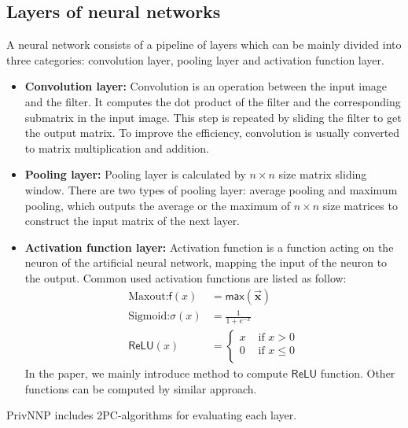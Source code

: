 \documentclass[letterpaper]{article} %
\begin{document}
    \subsection{Layers of neural networks}
    A neural network consists of a pipeline of layers which can be mainly divided into three categories:
    convolution layer, pooling layer and activation function layer.
    \begin{itemize}
        \item \textbf{Convolution layer:}
        Convolution is an operation between the input image and the filter.
        It computes the dot product of the filter and the corresponding submatrix in the input image.
        This step is repeated by sliding the filter to get the output matrix.
        To improve the efficiency, convolution is usually converted to matrix multiplication and addition.

        \item \textbf{Pooling layer:}
        Pooling layer is calculated by $n\times n$ size matrix sliding window.
        There are two types of pooling layer: average pooling and maximum pooling,
        which outputs the average or the maximum of $n\times n$ size matrices to construct the input matrix of the next layer.

        \item \textbf{Activation function layer:}
        Activation function is a function acting on the neuron of the artificial neural network,
        mapping the input of the neuron to the output.
        Common used activation functions are listed as follow:
        \begin{align*}
        \text{Maxout:} \mathsf{f}(x) &= \mathsf{max}( \overrightarrow{\mathbf{x}})\\
        \text{Sigmoid:} \sigma(x) &=\frac{1}{1+e^{-x}}\\
        \mathsf{ReLU}(x)&=\begin{cases}
            x & \text{ if } x > 0 \\
            0 & \text{ if } x \leqslant 0 \\
            \end{cases}
        \end{align*}
        In the paper, we mainly introduce method to compute $\mathsf{ReLU}$ function.
        Other functions can be computed by similar approach.
    \end{itemize}
    PrivNNP includes 2PC-algorithms for evaluating each layer.
\end{document}

